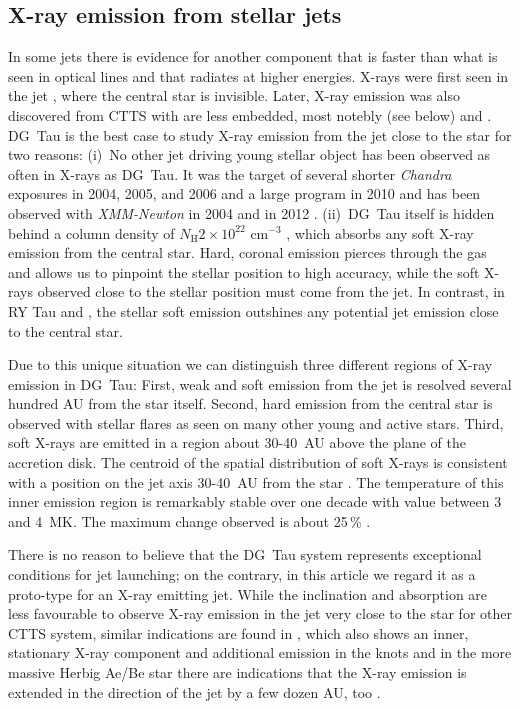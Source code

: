 \subsection{X-ray emission from stellar jets}
\label{sect:introxray}
In some jets there is evidence for another component that is faster than what is seen in optical lines and that radiates at higher energies. X-rays were first seen in the jet  \citep{2001Natur.413..708P,2012A&A...542A.123S}, where the central star is invisible. Later, X-ray emission was also discovered from CTTS with are less embedded, most notebly  (see below) and \citep{2014ApJ...788..101S}. DG~Tau is the best case to study X-ray emission from the jet close to the star for two reasons: (i)~No other jet driving young stellar object has been observed as often in X-rays as DG~Tau. It was the target of several shorter \emph{Chandra} exposures in 2004, 2005, and 2006 and a large program in 2010 \citep{2005ApJ...626L..53G,2008A&A...478..797G,2011ASPC..448..617G} and has been observed with \emph{XMM-Newton} in 2004 \citep{2007A&A...468..353G} and in 2012 \citep{SchneiderDGTauXray}. (ii)~DG~Tau itself is hidden behind a column density of $N_{\textrm{H}}2\times10^{22}\textrm{ cm}^{-3}$ \citep{2008A&A...478..797G}, which absorbs any soft X-ray emission from the central star. Hard, coronal emission pierces through the gas and allows us to pinpoint the stellar position to high accuracy, while the soft X-rays observed close to the stellar position must come from the jet. In contrast, in RY Tau and  \citep{2013A&A...552A.142G}, the stellar soft emission outshines any potential jet emission close to the central star.

Due to this unique situation we can distinguish three different regions of X-ray emission in DG~Tau: First, weak and soft emission from the jet is resolved several hundred AU from the star itself. Second, hard emission from the central star is observed with stellar flares as seen on many other young and active stars. Third, soft X-rays are emitted in a region about 30-40~AU above the plane of the accretion disk. The centroid of the spatial distribution of soft X-rays is consistent with a position on the jet axis 30-40~AU from the star \citep{2008A&A...488L..13S}. The temperature of this inner emission region is remarkably stable over one decade with value between 3 and 4~MK. The maximum change observed is about 25\,\% \citep{SchneiderDGTauXray}.

There is no reason to believe that the DG~Tau system represents exceptional conditions for jet launching; on the contrary, in this article we regard it as a proto-type for an X-ray emitting jet. While the inclination and absorption are less favourable to observe X-ray emission in the jet very close to the star for other CTTS system, similar indications are found in  , which also shows an inner, stationary X-ray component and additional emission in the knots \citep{2010A&A...511A..42B,2011A&A...530A.123S} and in the more massive Herbig Ae/Be star  there are indications that the X-ray emission is extended in the direction of the jet by a few dozen AU, too \citep{2005ApJ...628..811S,2013A&A...552A.142G}.

